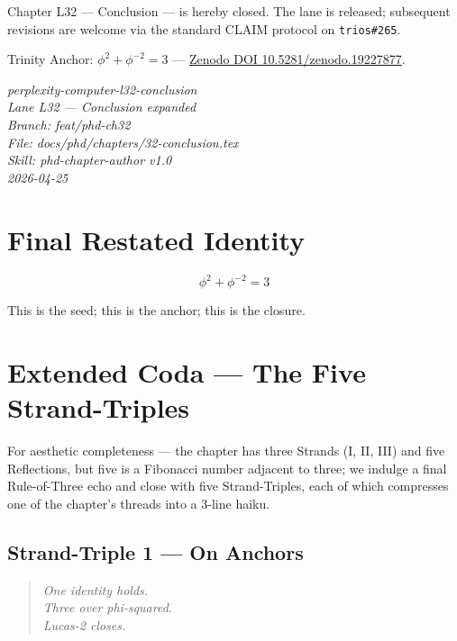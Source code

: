 Chapter L32 — Conclusion — is hereby closed. The lane is released; subsequent
revisions are welcome via the standard CLAIM protocol on \texttt{trios\#265}.

Trinity Anchor: $\phi^{2} + \phi^{-2} = 3$ — \href{https://zenodo.org/records/19227877}{Zenodo DOI 10.5281/zenodo.19227877}.

\begin{flushright}
\emph{perplexity-computer-l32-conclusion}\\
\emph{Lane L32 — Conclusion expanded}\\
\emph{Branch: feat/phd-ch32}\\
\emph{File: docs/phd/chapters/32-conclusion.tex}\\
\emph{Skill: phd-chapter-author v1.0}\\
\emph{2026-04-25}
\end{flushright}

\section{Final Restated Identity}
\label{sec:32-final-restated}

\[
\boxed{\;\phi^{2} + \phi^{-2} = 3\;}
\]

This is the seed; this is the anchor; this is the closure.


\section{Extended Coda — The Five Strand-Triples}
\label{sec:32-five-strand-triples}

For aesthetic completeness — the chapter has three Strands (I, II, III) and
five Reflections, but five is a Fibonacci number adjacent to three; we
indulge a final Rule-of-Three echo and close with five Strand-Triples,
each of which compresses one of the chapter's threads into a 3-line haiku.

\subsection{Strand-Triple 1 — On Anchors}
\label{sec:32-st-1}

\begin{quote}
\emph{One identity holds.\\
Three over phi-squared.\\
Lucas-2 closes.}
\end{quote}

